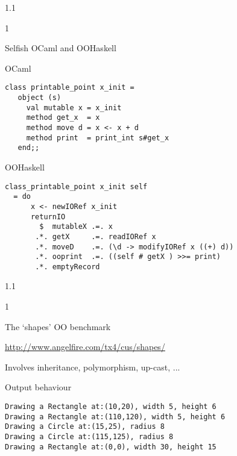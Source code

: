 \documentclass{slides}
\newenvironment{myslide}{\begin{slide}\color{Blue}\begin{boxedminipage}{1.1\hsize}\begin{boxedminipage}{1\hsize}\color{Black}
\vspace{-170\in}
}{%
\smallskip
\end{boxedminipage}
\end{boxedminipage}
\end{slide}}
\newenvironment{myslide}{\begin{slide}
}{%
\end{slide}}
\newenvironment{myslide}{\begin{slide}\color{White}\begin{boxedminipage}{1.1\hsize}\color{Black}
\vspace{-170\in}
}{%
\smallskip
\end{boxedminipage}
\end{slide}}
\newcommand{\header}[1]{{\large \color{Red} #1}}
\begin{document}



\begin{myslide}

\header{Selfish OCaml and OOHaskell}

{\tiny

OCaml

\begin{verbatim}
class printable_point x_init =
   object (s)
     val mutable x = x_init
     method get_x  = x
     method move d = x <- x + d
     method print  = print_int s#get_x
   end;;
\end{verbatim}

OOHaskell

\begin{verbatim}
class_printable_point x_init self
  = do
      x <- newIORef x_init
      returnIO
        $  mutableX .=. x
       .*. getX     .=. readIORef x
       .*. moveD    .=. (\d -> modifyIORef x ((+) d))
       .*. ooprint  .=. ((self # getX ) >>= print)
       .*. emptyRecord
\end{verbatim}

}

\end{myslide}






\begin{myslide}

\header{The `shapes' OO benchmark}

\bigskip

\url{http://www.angelfire.com/tx4/cus/shapes/}

\bigskip

Involves inheritance, polymorphism, up-cast, ...

\bigskip

{\small

Output behaviour

\begin{verbatim}
Drawing a Rectangle at:(10,20), width 5, height 6
Drawing a Rectangle at:(110,120), width 5, height 6
Drawing a Circle at:(15,25), radius 8
Drawing a Circle at:(115,125), radius 8
Drawing a Rectangle at:(0,0), width 30, height 15
\end{verbatim}

}

\end{myslide}
\end{document}
